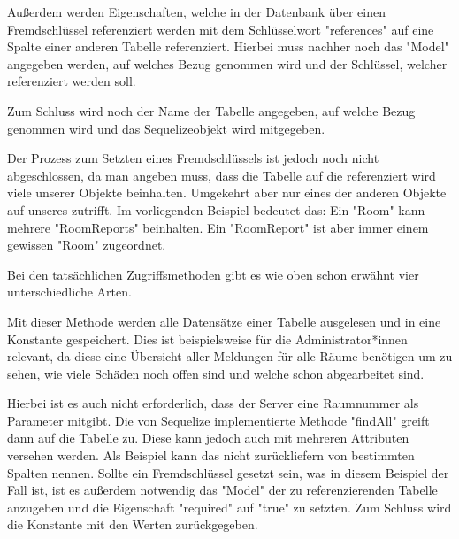 Außerdem werden Eigenschaften, welche in der Datenbank über einen Fremdschlüssel referenziert werden mit dem Schlüsselwort "references" auf eine Spalte einer anderen Tabelle referenziert. Hierbei muss nachher noch das "Model" angegeben werden,
auf welches Bezug genommen wird und der Schlüssel, welcher referenziert werden soll.

Zum Schluss wird noch der Name der Tabelle angegeben, auf welche Bezug genommen wird und das Sequelizeobjekt wird mitgegeben.


Der Prozess zum Setzten eines Fremdschlüssels ist jedoch noch nicht abgeschlossen, da man angeben muss, dass die Tabelle auf die referenziert wird viele unserer Objekte beinhalten. Umgekehrt aber nur eines der anderen Objekte auf unseres zutrifft. Im vorliegenden Beispiel bedeutet das: Ein "Room" kann mehrere "RoomReports" beinhalten. Ein "RoomReport" ist aber immer einem gewissen "Room" zugeordnet.


Bei den tatsächlichen Zugriffsmethoden gibt es wie oben schon erwähnt vier unterschiedliche Arten.


Mit dieser Methode werden alle Datensätze einer Tabelle ausgelesen und in eine Konstante gespeichert. Dies ist beispielsweise für die Administrator*innen relevant, da diese eine Übersicht aller Meldungen für alle Räume benötigen um zu sehen, wie viele Schäden noch offen sind und welche schon abgearbeitet sind.

Hierbei ist es auch nicht erforderlich, dass der Server eine Raumnummer als Parameter mitgibt. Die von Sequelize implementierte Methode "findAll" greift dann auf die Tabelle zu. Diese kann jedoch auch mit mehreren Attributen versehen werden. Als Beispiel kann das nicht zurückliefern von bestimmten Spalten nennen. Sollte ein Fremdschlüssel gesetzt sein, was in diesem Beispiel der Fall ist, ist es außerdem notwendig das "Model" der zu referenzierenden Tabelle anzugeben und die Eigenschaft "required" auf "true" zu setzten. Zum Schluss wird die Konstante mit den Werten zurückgegeben.



